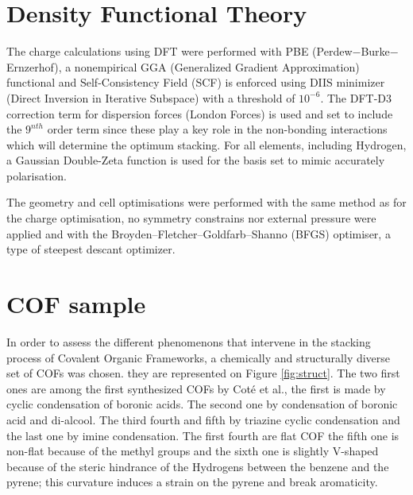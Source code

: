 \section{Density Functional Theory}
\label{sec:dft}

The charge calculations using DFT were performed with PBE (Perdew$-$Burke$-$Ernzerhof), a nonempirical GGA (Generalized Gradient Approximation) functional and Self-Consistency Field (SCF) is enforced using DIIS minimizer (Direct Inversion in Iterative Subspace) \cite{pulay_convergence_1980}\cite{pulay_improved_1982}\cite{shepard_comments_2007} with a threshold of $10^{-6}$. The DFT-D3 correction term for dispersion forces (London Forces) is used and set to include the $9^{nth}$ order term since these play a key role in the non-bonding interactions which will determine the optimum stacking. For all elements, including Hydrogen, a Gaussian Double-Zeta function is used for the basis set \cite{vandevondele_gaussian_2007} to mimic accurately polarisation.

The geometry and cell optimisations were performed with the same method as for the charge optimisation, no symmetry constrains nor external pressure were applied and with the Broyden–Fletcher–Goldfarb–Shanno (BFGS) optimiser, a type of steepest descant optimizer.

\section{COF sample}
In order to assess the different phenomenons that intervene in the stacking process of Covalent Organic Frameworks, a chemically and structurally diverse set of COFs was chosen. they are represented on Figure \ref{fig:struct}. The two first ones are among the first synthesized COFs by Cot\'e et al., the first is made by cyclic condensation of boronic acids. The second one by condensation of boronic acid and di-alcool. The third fourth and fifth by triazine cyclic condensation and the last one by imine condensation. The first fourth are flat COF the fifth one is non-flat because of the methyl groups and the sixth one is slightly V-shaped because of the steric hindrance of the Hydrogens between the benzene and the pyrene; this curvature induces a strain on the pyrene and break aromaticity.

